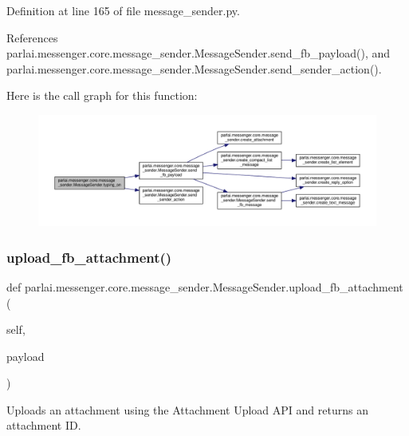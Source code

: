 Definition at line 165 of file message\+\_\+sender.\+py.



References parlai.\+messenger.\+core.\+message\+\_\+sender.\+Message\+Sender.\+send\+\_\+fb\+\_\+payload(), and parlai.\+messenger.\+core.\+message\+\_\+sender.\+Message\+Sender.\+send\+\_\+sender\+\_\+action().

Here is the call graph for this function\+:
\nopagebreak
\begin{figure}[H]
\begin{center}
\leavevmode
\includegraphics[width=350pt]{classparlai_1_1messenger_1_1core_1_1message__sender_1_1MessageSender_af18c8b2ca27ba3ff86eed8175cea2656_cgraph}
\end{center}
\end{figure}
\mbox{\label{classparlai_1_1messenger_1_1core_1_1message__sender_1_1MessageSender_af3be069cd31087804241627444abe859}} 
\subsubsection{\texorpdfstring{upload\+\_\+fb\+\_\+attachment()}{upload\_fb\_attachment()}}
{\footnotesize\ttfamily def parlai.\+messenger.\+core.\+message\+\_\+sender.\+Message\+Sender.\+upload\+\_\+fb\+\_\+attachment (\begin{DoxyParamCaption}\item[{}]{self,  }\item[{}]{payload }\end{DoxyParamCaption})}

\begin{DoxyVerb}Uploads an attachment using the Attachment Upload API and returns
an attachment ID.
\end{DoxyVerb}
 

